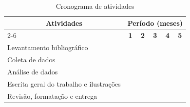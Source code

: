 \begin{table}[htb]
    \centering
    \caption{Cronograma de atividades}
    \label{tab:cronograma}
    \renewcommand{\arraystretch}{1.5} %
    \begin{tabularx}{\textwidth}{X c c c c c}
        \hline
        \multicolumn{1}{c}{\multirow{2}{*}{\textbf{Atividades}}} & \multicolumn{5}{c}{\textbf{Período (meses)}} \\ \cline{2-6}
        \multicolumn{1}{c}{} & \textbf{1} & \textbf{2} & \textbf{3} & \textbf{4} & \textbf{5} \\ \hline
        
        Levantamento bibliográfico & \cellcolor{gray!60} & \cellcolor{gray!60} & \ &  &  \\ %
        
        Coleta de dados & \cellcolor{gray!60} & \cellcolor{gray!60} & \cellcolor{gray!60} &  &  \\ %
        
        Análise de dados &  & \cellcolor{gray!60} & \cellcolor{gray!60} & \cellcolor{gray!60} &  \\ %
        
        Escrita geral do trabalho e ilustrações &  & \cellcolor{gray!60} & \cellcolor{gray!60} & \cellcolor{gray!60} &  \\ %
        
        Revisão, formatação e entrega &  &  &  &  & \cellcolor{gray!60} \\ \hline
    \end{tabularx}
    \vspace{0.2cm} %
    
\end{table} 